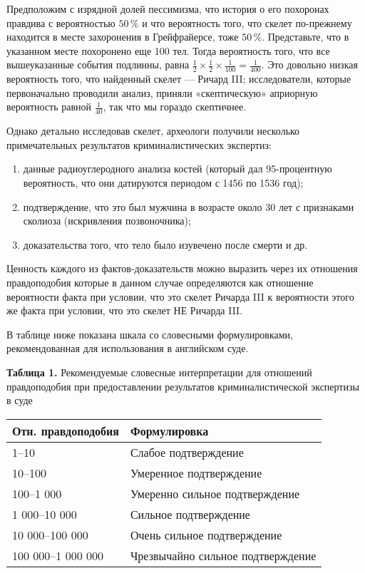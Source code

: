 \documentclass[11pt,a4paper]{article}
\providecommand{\tightlist}{%
      \setlength{\itemsep}{0pt}\setlength{\parskip}{0pt}}
\begin{document}
Предположим с изрядной долей пессимизма, что история о его похоронах
правдива с вероятностью \(50\,\%\) и что вероятность того, что скелет
по-прежнему находится в месте захоронения в Грейфрайерсе, тоже
\(50\,\%\). Представьте, что в указанном месте похоронено еще 100 тел.
Тогда вероятность того, что все вышеуказанные события подлинны, равна
\(\frac{1}{2} \times \frac{1}{2} \times \frac{1}{100} = \frac{1}{400}\).
Это довольно низкая вероятность того, что найденный скелет --- Ричард
III; исследователи, которые первоначально проводили анализ, приняли
«скептическую» априорную вероятность равной \(\frac{1}{40}\), так что мы
гораздо скептичнее.

    Однако детально исследовав скелет, археологи получили несколько
примечательных результатов криминалистических экспертиз:

\begin{enumerate}
\def\labelenumi{\arabic{enumi}.}
\tightlist
\item
  данные радиоуглеродного анализа костей (который дал 95-процентную
  вероятность, что они датируются периодом с 1456 по 1536 год);
\item
  подтверждение, что это был мужчина в возрасте около 30 лет с
  признаками сколиоза (искривления позвоночника);
\item
  доказательства того, что тело было изувечено после смерти и др.
\end{enumerate}

Ценность каждого из фактов-доказательств можно выразить через их
отношения правдоподобия которые в данном случае определяются как
отношение вероятности факта при условии, что это скелет Ричарда III к
вероятности этого же факта при условии, что это скелет НЕ Ричарда III.

В таблице ниже показана шкала со словесными формулировками,
рекомендованная для использования в английском суде.

    \textbf{Таблица 1.} Рекомендуемые словесные интерпретации для отношений
правдоподобия при предоставлении результатов криминалистической
экспертизы в суде

\begin{longtable}[]{@{}ll@{}}
\toprule
Отн. правдоподобия & Формулировка \\
\midrule
\endhead
1--10 & Слабое подтверждение \\
10--100 & Умеренное подтверждение \\
100--1 000 & Умеренно сильное подтверждение \\
1 000--10 000 & Сильное подтверждение \\
10 000--100 000 & Очень сильное подтверждение \\
100 000--1 000 000 & Чрезвычайно сильное подтверждение \\
\bottomrule
\end{longtable}
\end{document}
